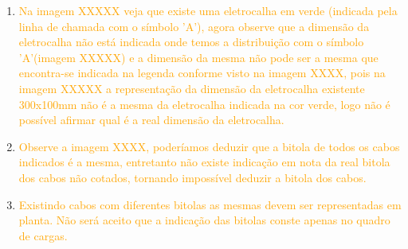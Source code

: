 \begin{enumerate}
	\item \textcolor{orange}{Na imagem XXXXX veja que existe uma eletrocalha em verde (indicada pela linha de chamada com o símbolo 'A'), agora observe que a dimensão da eletrocalha não está indicada onde temos a distribuição com o símbolo 'A'(imagem XXXXX) e a dimensão da mesma não pode ser a mesma que encontra-se indicada na legenda conforme visto na imagem XXXX, pois na imagem XXXXX a representação da dimensão da eletrocalha existente 300x100mm não é a mesma da eletrocalha indicada na cor verde, logo não é possível afirmar qual é a real dimensão da eletrocalha.
	}
	
	\item \textcolor{orange}{Observe a imagem XXXX, poderíamos deduzir que a bitola de todos os cabos indicados é a mesma, entretanto não existe indicação em nota da real bitola dos cabos não cotados, tornando impossível deduzir a bitola dos cabos.
	}
	
	\item \textcolor{orange}{Existindo cabos com diferentes bitolas as mesmas devem ser representadas em planta. Não será aceito que a indicação das bitolas conste apenas no quadro de cargas.
	}
\end{enumerate}



